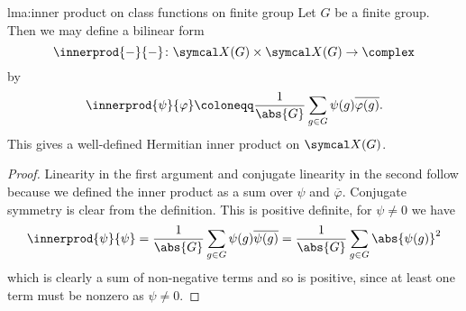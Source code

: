 \begin{lma}{}{lma:inner product on class functions on finite group}
    Let \(G\) be a finite group.
    Then we may define a bilinear form
    \begin{equation}
        \innerprod{-}{-} \colon \classFunctions(G) \times \classFunctions(G) \to \complex
    \end{equation}
    by
    \begin{equation}
        \innerprod{\psi}{\varphi} \coloneqq \frac{1}{\abs{G}} \sum_{g \in G} \psi(g) \overline{\varphi(g)}.
    \end{equation}
    This gives a well-defined Hermitian inner product on \(\classFunctions(G)\).
    \begin{proof}
        Linearity in the first argument and conjugate linearity in the second follow because we defined the inner product as a sum over \(\psi\) and \(\overline{\varphi}\).
        Conjugate symmetry is clear from the definition.
        This is positive definite, for \(\psi \ne 0\) we have
        \begin{equation}
            \innerprod{\psi}{\psi} = \frac{1}{\abs{G}} \sum_{g \in G} \psi(g)\overline{\psi(g)} = \frac{1}{\abs{G}} \sum_{g \in G} \abs{\psi(g)}^2
        \end{equation}
        which is clearly a sum of non-negative terms and so is positive, since at least one term must be nonzero as \(\psi \ne 0\).
    \end{proof}
\end{lma}

